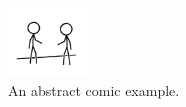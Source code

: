 






\begin{figure}
	\centering
	\includegraphics[width=0.19\textwidth]{figures/xkcd_example}
	\vspace{-10pt}
    \caption{An abstract comic example.}
    \label{fig:xkcd}
	\vspace{-10pt}
\end{figure}

